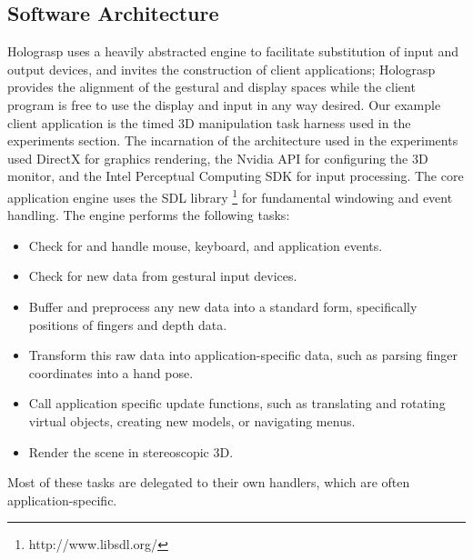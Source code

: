 \documentclass[pageno]{jpaper}
\begin{document}
\subsection{Software Architecture}
Holograsp uses a heavily abstracted engine to facilitate substitution of input and output devices, and invites the construction of
client applications; Holograsp provides the alignment of the
gestural and display spaces while the client program is free to use the display and input in any way desired. Our example client application
is the timed 3D manipulation task harness used in the experiments section. The incarnation of the architecture used in the
experiments used DirectX for graphics rendering, the Nvidia API for configuring the 3D monitor, and the Intel Perceptual
Computing SDK for input processing.
The core application engine uses the SDL library \footnote{http://www.libsdl.org/} for fundamental windowing and event handling.
The engine performs the following tasks:
\begin{itemize}
\item Check for and handle mouse, keyboard, and application events.
\item Check for new data from gestural input devices.
\item Buffer and preprocess any new data into a standard form, specifically positions of fingers and depth data.
\item Transform this raw data into application-specific data, such as parsing finger coordinates into a hand pose.
\item Call application specific update functions, such as translating and rotating virtual objects, creating new models, or navigating menus.
\item Render the scene in stereoscopic 3D.
\end{itemize}

Most of these tasks are delegated to their own handlers, which are often application-specific.
\end{document}
